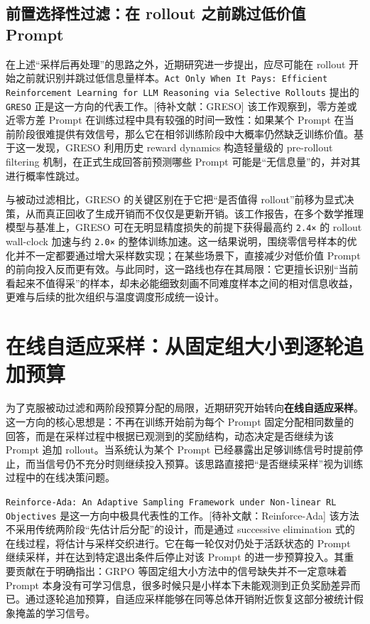 \subsection{前置选择性过滤：在 rollout 之前跳过低价值 Prompt}

在上述“采样后再处理”的思路之外，近期研究进一步提出，应尽可能在 rollout 开始之前就识别并跳过低信息量样本。\texttt{Act Only When It Pays: Efficient Reinforcement Learning for LLM Reasoning via Selective Rollouts} 提出的 \texttt{GRESO} 正是这一方向的代表工作。[待补文献：GRESO] 该工作观察到，零方差或近零方差 Prompt 在训练过程中具有较强的时间一致性：如果某个 Prompt 在当前阶段很难提供有效信号，那么它在相邻训练阶段中大概率仍然缺乏训练价值。基于这一发现，GRESO 利用历史 reward dynamics 构造轻量级的 pre-rollout filtering 机制，在正式生成回答前预测哪些 Prompt 可能是“无信息量”的，并对其进行概率性跳过。

与被动过滤相比，GRESO 的关键区别在于它把“是否值得 rollout”前移为显式决策，从而真正回收了生成开销而不仅仅是更新开销。该工作报告，在多个数学推理模型与基准上，GRESO 可在无明显精度损失的前提下获得最高约 \texttt{2.4×} 的 rollout wall-clock 加速与约 \texttt{2.0×} 的整体训练加速。这一结果说明，围绕零信号样本的优化并不一定都要通过增大采样数实现；在某些场景下，直接减少对低价值 Prompt 的前向投入反而更有效。与此同时，这一路线也存在其局限：它更擅长识别“当前看起来不值得采”的样本，却未必能细致刻画不同难度样本之间的相对信息收益，更难与后续的批次组织与温度调度形成统一设计。

\section{在线自适应采样：从固定组大小到逐轮追加预算}

为了克服被动过滤和两阶段预算分配的局限，近期研究开始转向\textbf{在线自适应采样}。这一方向的核心思想是：不再在训练开始前为每个 Prompt 固定分配相同数量的回答，而是在采样过程中根据已观测到的奖励结构，动态决定是否继续为该 Prompt 追加 rollout。当系统认为某个 Prompt 已经暴露出足够训练信号时提前停止，而当信号仍不充分时则继续投入预算。该思路直接把“是否继续采样”视为训练过程中的在线决策问题。

\texttt{Reinforce-Ada: An Adaptive Sampling Framework under Non-linear RL Objectives} 是这一方向中极具代表性的工作。[待补文献：Reinforce-Ada] 该方法不采用传统两阶段“先估计后分配”的设计，而是通过 successive elimination 式的在线过程，将估计与采样交织进行。它在每一轮仅对仍处于活跃状态的 Prompt 继续采样，并在达到特定退出条件后停止对该 Prompt 的进一步预算投入。其重要贡献在于明确指出：GRPO 等固定组大小方法中的信号缺失并不一定意味着 Prompt 本身没有可学习信息，很多时候只是小样本下未能观测到正负奖励差异而已。通过逐轮追加预算，自适应采样能够在同等总体开销附近恢复这部分被统计假象掩盖的学习信号。

